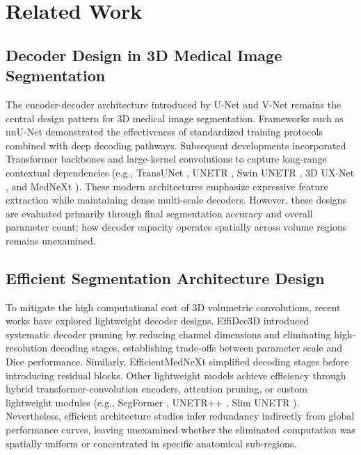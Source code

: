 \section{Related Work}
\label{sec:related}

\subsection{Decoder Design in 3D Medical Image Segmentation}
The encoder-decoder architecture introduced by U-Net \cite{ronneberger2015u,cicek20163d} and V-Net \cite{milletari2016v} remains the central design pattern for 3D medical image segmentation. Frameworks such as nnU-Net \cite{isensee2021nnu} demonstrated the effectiveness of standardized training protocols combined with deep decoding pathways. Subsequent developments incorporated Transformer backbones and large-kernel convolutions to capture long-range contextual dependencies (e.g., TransUNet \cite{chen2021transunet}, UNETR \cite{hatamizadeh2022unetr}, Swin UNETR \cite{hatamizadeh2022swin}, 3D UX-Net \cite{lee20233d}, and MedNeXt \cite{roy2023mednext}). These modern architectures emphasize expressive feature extraction while maintaining dense multi-scale decoders. However, these designs are evaluated primarily through final segmentation accuracy and overall parameter count; how decoder capacity operates spatially across volume regions remains unexamined.

\subsection{Efficient Segmentation Architecture Design}
To mitigate the high computational cost of 3D volumetric convolutions, recent works have explored lightweight decoder designs. EffiDec3D \cite{effidec3d} introduced systematic decoder pruning by reducing channel dimensions and eliminating high-resolution decoding stages, establishing trade-offs between parameter scale and Dice performance. Similarly, EfficientMedNeXt \cite{efficientmednext} simplified decoding stages before introducing residual blocks. Other lightweight models achieve efficiency through hybrid transformer-convolution encoders, attention pruning, or custom lightweight modules (e.g., SegFormer \cite{xie2021segformer}, UNETR++ \cite{shaker2024unetrpp}, Slim UNETR \cite{jiang2024slimunetr}). Nevertheless, efficient architecture studies infer redundancy indirectly from global performance curves, leaving unexamined whether the eliminated computation was spatially uniform or concentrated in specific anatomical sub-regions.


